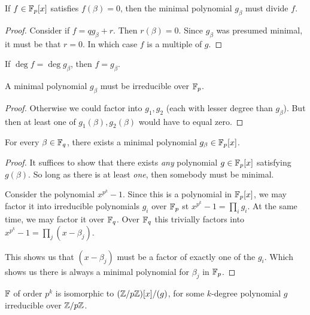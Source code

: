 \begin{proposition}
  If $f \in \mathbb{F}_p[x]$ satisfies $f(\beta) = 0$, then the minimal
  polynomial $g_\beta$ must divide $f$.
\end{proposition}

\begin{proof}
  Consider if $f = qg_\beta + r$. Then $r(\beta) = 0$. Since $g_\beta$
  was presumed minimal, it must be that $r = 0$. In which case $f$ is a
  multiple of $g$.
\end{proof}

\begin{corollary}
  If $\deg f = \deg g_\beta$, then $f = g_\beta$.
\end{corollary}

\begin{proposition}
  A minimal polynomial $g_\beta$ must be irreducible over $\mathbb{F}_p$.
\end{proposition}

\begin{proof}
  Otherwise we could factor into $g_1, g_2$ (each with lesser degree
  than $g_\beta$). But then at least one of $g_1(\beta), g_2(\beta)$
  would have to equal zero.
\end{proof}

\begin{proposition}
  For every $\beta \in \mathbb{F}_q$, there exists a minimal polynomial $g_\beta
  \in \mathbb{F}_p[x]$.
\end{proposition}

\begin{proof}
  It suffices to show that there exists \emph{any} polynomial $g \in
  \mathbb{F}_p[x]$ satisfying $g(\beta)$. So long as there is at least
  \emph{one}, then somebody must be minimal.

  Consider the polynomial $x^{p^k} - 1$. Since this is a polynomial in
  $\mathbb{F}_p[x]$, we may factor it into irreducible polynomials $g_i$ over
  $\mathbb{F}_p$ st $x^{p^k} - 1 = \prod_i g_i$. At the same time, we may factor
  it over $\mathbb{F}_q$. Over $\mathbb{F}_q$ this trivially factors into $x^{p^k} - 1 =
  \prod_j (x - \beta_j)$.

  This shows us that $(x - \beta_j)$ must be a factor of exactly one of
  the $g_i$. Which shows us there is always a minimal polynomial for
  $\beta_j$ in $\mathbb{F}_p$.
\end{proof}

\begin{theorem}
  $\mathbb{F}$ of order $p^k$ is isomorphic to $\mathopen{}\left( {\mathbb{Z} / p\mathbb{Z}} \right)\mathclose{}[x]/(g)$, for some
  $k$-degree polynomial $g$ irreducible over $\mathbb{Z} / p\mathbb{Z}$.
\end{theorem}

